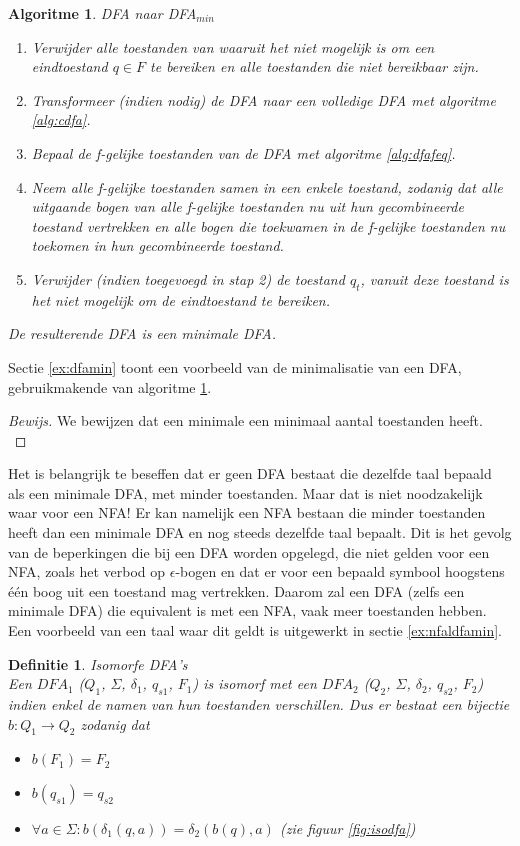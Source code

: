\documentclass[a4paper]{article}
\newtheorem{tdefinitie}{Definitie}[section]
\newenvironment{definitie}[1]%
  {\begin{mdframed}[backgroundcolor=silver,
    topline=false,
    rightline=false,
    leftline=false,
    bottomline=false]\begin{tdefinitie}#1\\\normalfont}%
  {\end{tdefinitie}\end{mdframed}}
\newtheorem{talgo}{Algoritme}[section]
\newenvironment{algoritme}[1]%
  {\begin{mdframed}[backgroundcolor=silver,
    topline=false,
    rightline=false,
    leftline=false,
    bottomline=false]\begin{talgo}#1\\\normalfont}%
  {\end{talgo}\end{mdframed}}
\newenvironment{bewijs}[1]%
  {\begin{mdframed}[topline=true,
    rightline=true,
    leftline=true,
    bottomline=true]\begin{proof}[Bewijs]#1\\[.2cm]\normalfont}%
  {\end{proof}\end{mdframed}}
\newenvironment{enumalgo}%
  {\begin{enumerate}[leftmargin=1.5cm,label=Stap \arabic*:]}%
  {\end{enumerate}}
\begin{document}
\begin{algoritme}{DFA naar DFA$_{min}$}
  \label{alg:dfamin}
  \vspace{-5mm}\begin{enumalgo}
  \item Verwijder alle toestanden van waaruit het niet mogelijk is om een eindtoestand $q \in F$ te bereiken en alle toestanden die niet bereikbaar zijn.
  \item Transformeer (indien nodig) de DFA naar een volledige DFA met algoritme \ref{alg:cdfa}.
  \item Bepaal de f-gelijke toestanden van de DFA met algoritme \ref{alg:dfafeq}.
  \item Neem alle f-gelijke toestanden samen in een enkele toestand, zodanig dat alle uitgaande bogen van alle f-gelijke toestanden nu uit hun gecombineerde toestand vertrekken en alle bogen die toekwamen in de f-gelijke toestanden nu toekomen in hun gecombineerde toestand.
  \item Verwijder (indien toegevoegd in stap 2) de toestand $q_t$, vanuit deze toestand is het niet mogelijk om de eindtoestand te bereiken.
  \end{enumalgo}
  De resulterende DFA is een minimale DFA.
\end{algoritme}

Sectie \ref{ex:dfamin} toont een voorbeeld van de minimalisatie van een DFA, gebruikmakende van algoritme \ref{alg:dfamin}.

\begin{bewijs}{We bewijzen dat een minimale een minimaal aantal toestanden heeft.}
  
\end{bewijs}

Het is belangrijk te beseffen dat er geen DFA bestaat die dezelfde taal bepaald als een minimale DFA, met minder toestanden. Maar dat is niet noodzakelijk waar voor een NFA! Er kan namelijk een NFA bestaan die minder toestanden heeft dan een minimale DFA en nog steeds dezelfde taal bepaalt. Dit is het gevolg van de beperkingen die bij een DFA worden opgelegd, die niet gelden voor een NFA, zoals het verbod op $\epsilon$-bogen en dat er voor een bepaald symbool hoogstens \'e\'en boog uit een toestand mag vertrekken. Daarom zal een DFA (zelfs een minimale DFA) die equivalent is met een NFA, vaak meer toestanden hebben. Een voorbeeld van een taal waar dit geldt is uitgewerkt in sectie \ref{ex:nfaldfamin}.

\begin{definitie}{Isomorfe DFA's}
  Een $DFA_1$ ($Q_1$, $\Sigma$, $\delta_1$, $q_{s1}$, $F_1$) is isomorf met een $DFA_2$ ($Q_2$, $\Sigma$, $\delta_2$, $q_{s2}$, $F_2$) indien enkel de namen van hun toestanden verschillen. Dus er bestaat een bijectie $b: Q_1 \rightarrow Q_2$ zodanig dat
  \begin{itemize}
  \item $b(F_1) = F_2$
  \item $b(q_{s1}) = q_{s2}$
  \item $\forall a \in \Sigma: b(\delta_1(q,a)) = \delta_2(b(q),a)$ (zie figuur \ref{fig:isodfa})
  \end{itemize}
\end{definitie}
\end{document}
